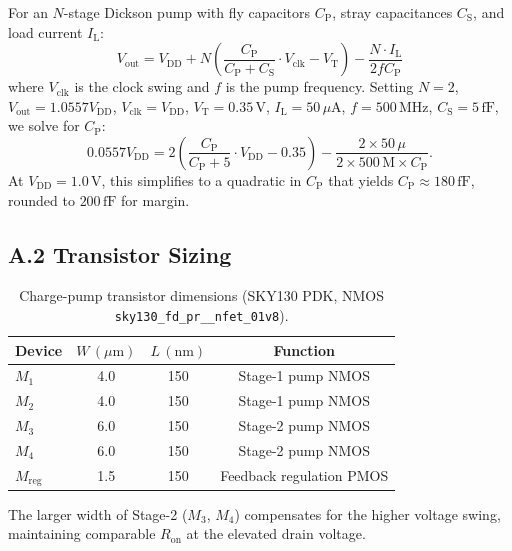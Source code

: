 For an $N$-stage Dickson pump with fly capacitors $C_{\mathrm{P}}$,
stray capacitances $C_{\mathrm{S}}$, and load current $I_{\mathrm{L}}$:
\[
  V_{\mathrm{out}} = V_{\mathrm{DD}} + N \left(
    \frac{C_{\mathrm{P}}}{C_{\mathrm{P}} + C_{\mathrm{S}}} \cdot V_{\mathrm{clk}}
    - V_{\mathrm{T}} \right) - \frac{N \cdot I_{\mathrm{L}}}{2 f C_{\mathrm{P}}}
\]
where $V_{\mathrm{clk}}$ is the clock swing and $f$ is the pump
frequency.  Setting $N=2$, $V_{\mathrm{out}} = 1.0557 V_{\mathrm{DD}}$,
$V_{\mathrm{clk}} = V_{\mathrm{DD}}$, $V_{\mathrm{T}} = 0.35\,\text{V}$,
$I_{\mathrm{L}} = 50\,\mu\text{A}$, $f = 500\,\text{MHz}$,
$C_{\mathrm{S}} = 5\,\text{fF}$, we solve for $C_{\mathrm{P}}$:
\[
  0.0557 V_{\mathrm{DD}} = 2 \left(
    \frac{C_{\mathrm{P}}}{C_{\mathrm{P}}+5} \cdot V_{\mathrm{DD}} - 0.35
  \right) - \frac{2 \times 50\,\mu}{2 \times 500\,\text{M} \times C_{\mathrm{P}}}.
\]
At $V_{\mathrm{DD}} = 1.0\,\text{V}$, this simplifies to a quadratic in
$C_{\mathrm{P}}$ that yields $C_{\mathrm{P}} \approx 180\,\text{fF}$,
rounded to $200\,\text{fF}$ for margin.

\subsection*{A.2 Transistor Sizing}

\begin{table}[htbp]
  \centering
  \caption{Charge-pump transistor dimensions (SKY130 PDK, NMOS
    \texttt{sky130\_fd\_pr\_\_nfet\_01v8}).}
  \label{tab:pump-sizes}
  \begin{tabular}{lccc}
    \hline
    \textbf{Device} & $W\,(\mu\text{m})$ & $L\,(\text{nm})$ & \textbf{Function} \\
    \hline
    $M_1$ & 4.0 & 150 & Stage-1 pump NMOS \\
    $M_2$ & 4.0 & 150 & Stage-1 pump NMOS \\
    $M_3$ & 6.0 & 150 & Stage-2 pump NMOS \\
    $M_4$ & 6.0 & 150 & Stage-2 pump NMOS \\
    $M_{\mathrm{reg}}$ & 1.5 & 150 & Feedback regulation PMOS \\
    \hline
  \end{tabular}
\end{table}

The larger width of Stage-2 ($M_3$, $M_4$) compensates for the higher
voltage swing, maintaining comparable $R_{\mathrm{on}}$ at the
elevated drain voltage.

